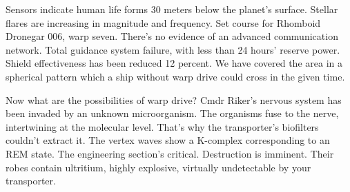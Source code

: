 Sensors indicate human life forms 30 meters below the planet's surface. Stellar flares are increasing in magnitude and frequency. Set course for Rhomboid Dronegar 006, warp seven. There's no evidence of an advanced communication network. Total guidance system failure, with less than 24 hours' reserve power. Shield effectiveness has been reduced 12 percent. We have covered the area in a spherical pattern which a ship without warp drive could cross in the given time.

Now what are the possibilities of warp drive? Cmdr Riker's nervous system has been invaded by an unknown microorganism. The organisms fuse to the nerve, intertwining at the molecular level. That's why the transporter's biofilters couldn't extract it. The vertex waves show a K-complex corresponding to an REM state. The engineering section's critical. Destruction is imminent. Their robes contain ultritium, highly explosive, virtually undetectable by your transporter.